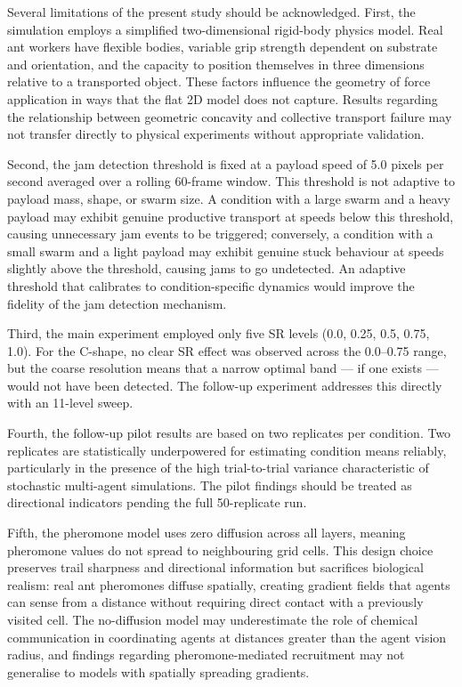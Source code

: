 Several limitations of the present study should be acknowledged. First, the simulation employs a simplified two-dimensional rigid-body physics model. Real ant workers have flexible bodies, variable grip strength dependent on substrate and orientation, and the capacity to position themselves in three dimensions relative to a transported object. These factors influence the geometry of force application in ways that the flat 2D model does not capture. Results regarding the relationship between geometric concavity and collective transport failure may not transfer directly to physical experiments without appropriate validation.

Second, the jam detection threshold is fixed at a payload speed of 5.0 pixels per second averaged over a rolling 60-frame window. This threshold is not adaptive to payload mass, shape, or swarm size. A condition with a large swarm and a heavy payload may exhibit genuine productive transport at speeds below this threshold, causing unnecessary jam events to be triggered; conversely, a condition with a small swarm and a light payload may exhibit genuine stuck behaviour at speeds slightly above the threshold, causing jams to go undetected. An adaptive threshold that calibrates to condition-specific dynamics would improve the fidelity of the jam detection mechanism.

Third, the main experiment employed only five SR levels (0.0, 0.25, 0.5, 0.75, 1.0). For the C-shape, no clear SR effect was observed across the 0.0--0.75 range, but the coarse resolution means that a narrow optimal band — if one exists — would not have been detected. The follow-up experiment addresses this directly with an 11-level sweep.

Fourth, the follow-up pilot results are based on two replicates per condition. Two replicates are statistically underpowered for estimating condition means reliably, particularly in the presence of the high trial-to-trial variance characteristic of stochastic multi-agent simulations. The pilot findings should be treated as directional indicators pending the full 50-replicate run.

Fifth, the pheromone model uses zero diffusion across all layers, meaning pheromone values do not spread to neighbouring grid cells. This design choice preserves trail sharpness and directional information but sacrifices biological realism: real ant pheromones diffuse spatially, creating gradient fields that agents can sense from a distance without requiring direct contact with a previously visited cell. The no-diffusion model may underestimate the role of chemical communication in coordinating agents at distances greater than the agent vision radius, and findings regarding pheromone-mediated recruitment may not generalise to models with spatially spreading gradients.

